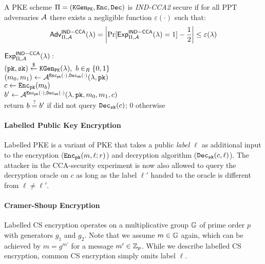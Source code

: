 \begin{definition}\label{def:indcca2}
A \ac{PKE} scheme $\Pi=(\mathtt{KGen_{PK}},\mathtt{Enc},\mathtt{Dec})$ is \emph{IND-CCA2} secure if for all \ac{PPT} adversaries $\mathcal{A}$ there exists a negligible function $\varepsilon(\cdot)$ such that:
\[\mathsf{Adv}_{\Pi,\mathcal{A}}^{\mathsf{IND-CCA}}(\lambda)=\left|\Pr[\mathsf{Exp}^{\mathsf{IND-CCA}}_{\Pi,\mathcal{A}}(\lambda)=1]-\frac12\right|\leq\varepsilon(\lambda)\]

\noindent
$\mathsf{Exp}^{\mathsf{IND-CCA}}_{\Pi,\mathcal{A}}(\lambda):$\\
\hspace*{2em}$(\mathtt{pk},\mathtt{sk})\stackrel{\$}{\gets}\mathtt{KGen_{PK}}(\lambda),~b\in_R\{0,1\}$\\
\hspace*{2em}$(m_0,m_1)\gets\mathcal{A}^{\mathtt{Enc}_\mathtt{pk}(\cdot),\mathtt{Dec}_\mathtt{sk}(\cdot)}(\lambda,\mathtt{pk})$\\
\hspace*{2em}$c\gets\mathtt{Enc}_\mathtt{pk}(m_b)$\\
\hspace*{2em}$b'\gets\mathcal{A}^{\mathtt{Enc}_\mathtt{pk}(\cdot),\mathtt{Dec}_\mathtt{sk}(\cdot)}(\lambda,\mathtt{pk},m_0,m_1,c)$\\
\hspace*{2em}return $b\stackrel{?}{=} b'$ if \cA did not query $\mathtt{Dec}_\mathtt{sk}(c)$; $0$ otherwise
\eod
\end{definition}

\paragraph{Labelled Public Key Encryption}
Labelled \ac{PKE} \cite{Shoup01,Canetti2005} is a variant of \ac{PKE} that takes a public \emph{label $\ell$} as additional input to the encryption ($\mathtt{Enc}_\mathtt{pk}(m,\ell; r)$) and decryption algorithm ($\mathtt{Dec}_\mathtt{sk}(c,\ell)$).
The attacker in the \ac{CCA}-security experiment is now also allowed to query the decryption oracle on $c$ as long as the label $\ell'$ handed to the oracle is different from $\ell\not=\ell'$.


\paragraph{Cramer-Shoup Encryption}\label{sec:csencryption}
Labelled \ac{CS} encryption operates on a multiplicative group $\mathbb{G}$ of prime order $p$ with generators $g_1$ and $g_2$.
Note that we assume $m\in\mathbb{G}$ again, which can be achieved by $m=g^{m'}$ for a message $m'\in\mathbb{Z}_p$.
While we describe labelled \ac{CS} encryption, common \ac{CS} encryption simply omits label $\ell$.

